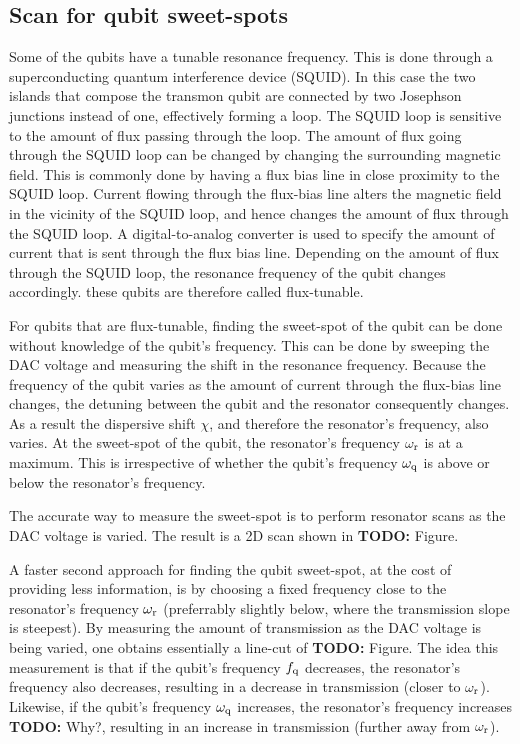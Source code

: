       \subsection{Scan for qubit sweet-spots}
        Some of the qubits have a tunable resonance frequency. This is done through a superconducting quantum interference device (SQUID). In this case the two islands that compose the transmon qubit are connected by two Josephson junctions instead of one, effectively forming a loop. The SQUID loop is sensitive to the amount of flux passing through the loop. The amount of flux going through the SQUID loop can be changed by changing the surrounding magnetic field. This is commonly done by having a flux bias line in close proximity to the SQUID loop. Current flowing through the flux-bias line alters the magnetic field in the vicinity of the SQUID loop, and hence changes the amount of flux through the SQUID loop. A digital-to-analog converter is used to specify the amount of current that is sent through the flux bias line. Depending on the amount of flux through the SQUID loop, the resonance frequency of the qubit changes accordingly. these qubits are therefore called flux-tunable.

        For qubits that are flux-tunable, finding the sweet-spot of the qubit can be done without knowledge of the qubit's frequency. This can be done by sweeping the DAC voltage and measuring the shift in the resonance frequency. Because the frequency of the qubit varies as the amount of current through the flux-bias line changes, the detuning between the qubit and the resonator consequently changes. As a result the dispersive shift $\chi$, and therefore the resonator's frequency, also varies. At the sweet-spot of the qubit, the resonator's frequency $\omega_\text{r}$ is at a maximum. This is irrespective of whether the qubit's frequency $\omega_\text{q}$ is above or below the resonator's frequency.

        The accurate way to measure the sweet-spot is to perform resonator scans as the DAC voltage is varied. The result is a 2D scan shown in \textbf{TODO:} Figure.

        A faster second approach for finding the qubit sweet-spot, at the cost of providing less information, is by choosing a fixed frequency close to the resonator's frequency $\omega_\text{r}$ (preferrably slightly below, where the transmission slope is steepest). By measuring the amount of transmission as the DAC voltage is being varied, one obtains essentially a line-cut of \textbf{TODO:} Figure. The idea this measurement is that if the qubit's frequency $f_\text{q}$ decreases, the resonator's frequency also decreases, resulting in a decrease in transmission (closer to $\omega_\text{r}$). Likewise, if the qubit's frequency $\omega_\text{q}$ increases, the resonator's frequency increases \textbf{TODO:} Why?, resulting in an increase in transmission (further away from $\omega_\text{r}$).

